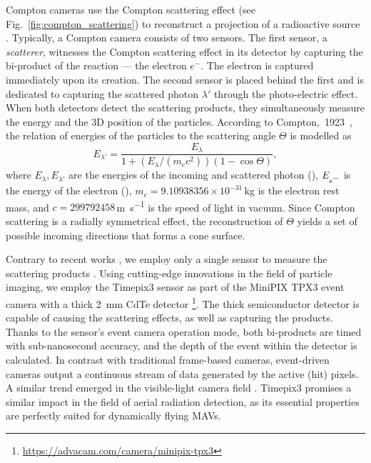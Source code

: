 \documentclass[a4paper,11pt,titlepage,twoside]{book}
\newcommand{\reffig}[1]{Fig.~\ref{#1}}
\newcommand{\minus}{\scalebox{0.75}[1.0]{$-$}}
\begin{document}
Compton cameras use the Compton scattering effect (see \reffig{fig:compton_scattering}) to reconstruct a projection of a radioactive source \cite{turecek2018compton}.
Typically, a Compton camera consists of two sensors.
The first sensor, a \emph{scatterer}, witnesses the Compton scattering effect in its detector by capturing the bi-product of the reaction --- the electron $e^{-}$.
The electron is captured immediately upon its creation.
The second sensor is placed behind the first and is dedicated to capturing the scattered photon $\lambda'$ through the photo-electric effect.
When both detectors detect the scattering products, they simultaneously measure the energy and the 3D position of the particles.
According to Compton,~1923~\cite{compton1923quantum}, the relation of energies of the particles to the scattering angle $\Theta$ is modelled as
\begin{equation}
  E_{\lambda'} = \frac{E_{\lambda}}{1 + \left(E_{\lambda} / \left(m_e c^2\right)\right)\left(1 - \cos\Theta\right)},
  \label{eq:compton_formulae}
\end{equation}
where $E_{\lambda}, E_{\lambda'}$ are the energies of the incoming and scattered photon (\si{\joul}), $E_{e^{\minus}}$ is the energy of the electron (\si{\joul}), $m_e = 9.10938356\times10^{-31}\,$\si{\kilogram} is the electron rest mass, and $c = 299792458$\,\si{\meter\per\second} is the speed of light in vacuum.
Since Compton scattering is a radially symmetrical effect, the reconstruction of $\Theta$ yields a set of possible incoming directions that forms a cone surface.

Contrary to recent works \cite{sato2019radiation, jiang2016prototype, terzioglu2018compton}, we employ only a single sensor to measure the scattering products \cite{turecek2020single}.
Using cutting-edge innovations in the field of particle imaging, we employ the Timepix3 sensor \cite{poikela2014timepix3} as part of the MiniPIX TPX3 event camera with a thick \SI{2}{\milli\meter} \ac{CdTe} detector \footnote{\url{https://advacam.com/camera/minipix-tpx3}}.
The thick semiconductor detector is capable of causing the scattering effects, as well as capturing the products.
Thanks to the sensor's event camera operation mode, both bi-products are timed with sub-nanosecond accuracy, and the depth of the event within the detector is calculated.
In contrast with traditional frame-based cameras, event-driven cameras output a continuous stream of data generated by the active (hit) pixels.
A similar trend emerged in the visible-light camera field \cite{kueng2016low}.
Timepix3 promises a similar impact in the field of aerial radiation detection, as its essential properties are perfectly suited for dynamically flying \acp{MAV}.
\end{document}
